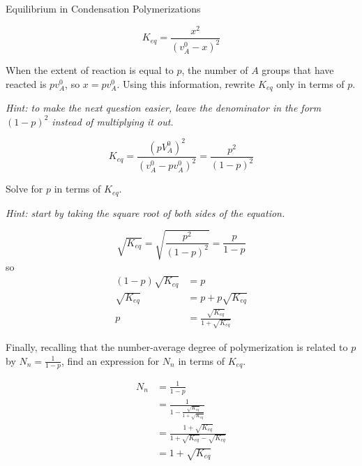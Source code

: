 \begin{activity}{Equilibrium in Condensation Polymerizations}
\begin{ctqs}
		\begin{solution}[1.05in]
			\begin{equation*}
				K_{eq} = \frac{x^2}{(v_A^0-x)^2}
			\end{equation*}
		\end{solution}
	
	\question  When the extent of reaction is equal to $p$, the number of $A$ groups that have reacted is $pv_A^0$, so $x=pv_A^0$.   Using this information, rewrite $K_{eq}$ only in terms of $p$.
	
		\emph{Hint: to make the next question easier, leave the denominator in the form $(1-p)^2$ instead of multiplying it out.}
		
		\begin{solution}[1.25in]
			\begin{equation*}
				K_{eq} = \frac{(pV_A^0)^2}{(v_A^0 - pv_A^0)^2} = \frac{p^2}{(1-p)^2}
			\end{equation*}
		\end{solution}
		
	\question Solve for $p$ in terms of $K_{eq}$.
	\label{\labelbase:ctq:Keqp}
		
		\emph{Hint: start by taking the square root of both sides of the equation.}
	
		\begin{solution}[3.25in]
			\begin{equation*}
				\sqrt{K_{eq}} = \sqrt{\frac{p^2}{(1-p)^2}} = \frac{p}{1-p}
			\end{equation*}
			so
			\begin{align*}
				(1-p)\sqrt{K_{eq}} &= p\\
				\sqrt{K_{eq}} &= p + p\sqrt{K_{eq}}  \\
				p &= \frac{\sqrt{K_{eq}}}{1+\sqrt{K_{eq}}}
			\end{align*}
		\end{solution}
	
	
	\question Finally, recalling that the number-average degree of polymerization is related to $p$ by $N_n = \frac{1}{1-p}$, find an expression for $N_n$ in terms of $K_{eq}$.
		
		\begin{solution}[2.5in]
			\begin{align*}
				N_n &= \frac{1}{1-p} \\
				&= \frac{1}{1-\frac{\sqrt{K_{eq}}}{1+\sqrt{K_{eq}}}}\\
				&= \frac{1+\sqrt{K_{eq}}}{1+\sqrt{K_{eq}} - \sqrt{K_{eq}}}\\
				&= 1+ \sqrt{K_{eq}}
			\end{align*}
		\end{solution}
		

\end{ctqs}
\end{activity}
